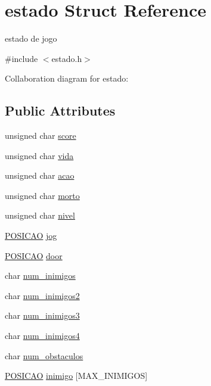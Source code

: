 \hypertarget{structestado}{}\section{estado Struct Reference}
\label{structestado}


estado de jogo  




{\ttfamily \#include $<$estado.\+h$>$}



Collaboration diagram for estado\+:
\subsection*{Public Attributes}
\begin{DoxyCompactItemize}
\item 
unsigned char \hyperlink{structestado_ac43134202ba42a5db42a1c5a2cf7ffee}{score}
\item 
unsigned char \hyperlink{structestado_a97b6a91e8e39dcc45100daf2160a681e}{vida}
\item 
unsigned char \hyperlink{structestado_a239f415b0cc18d6ba0f71d49e0ff9580}{acao}
\item 
unsigned char \hyperlink{structestado_a2f9104ddb43ef1af18ea05e37e358e63}{morto}
\item 
unsigned char \hyperlink{structestado_a6c596fad6caafe5949cf1a06be7684b9}{nivel}
\item 
\hyperlink{structposicao}{P\+O\+S\+I\+C\+AO} \hyperlink{structestado_abf55d0d40aafdd6829efbc8265b4f724}{jog}
\item 
\hyperlink{structposicao}{P\+O\+S\+I\+C\+AO} \hyperlink{structestado_a7415ebf0dc1fbc535407bb2bd669dc81}{door}
\item 
char \hyperlink{structestado_a6fbc4a80c4f371036f264ecfe27e5f9e}{num\+\_\+inimigos}
\item 
char \hyperlink{structestado_aee72c74ed46223084d992af2771c2dd0}{num\+\_\+inimigos2}
\item 
char \hyperlink{structestado_a9313b0aa4b93988070f08a615c18bd10}{num\+\_\+inimigos3}
\item 
char \hyperlink{structestado_a68897a14128dea552485db99a06c5c0a}{num\+\_\+inimigos4}
\item 
char \hyperlink{structestado_ac1a8a541e2301189833c6f713c416063}{num\+\_\+obstaculos}
\item 
\hyperlink{structposicao}{P\+O\+S\+I\+C\+AO} \hyperlink{structestado_a8f7d47deb337ae082beab6a574ace9e3}{inimigo} \mbox{[}M\+A\+X\+\_\+\+I\+N\+I\+M\+I\+G\+OS\mbox{]}

\end{DoxyCompactItemize}
